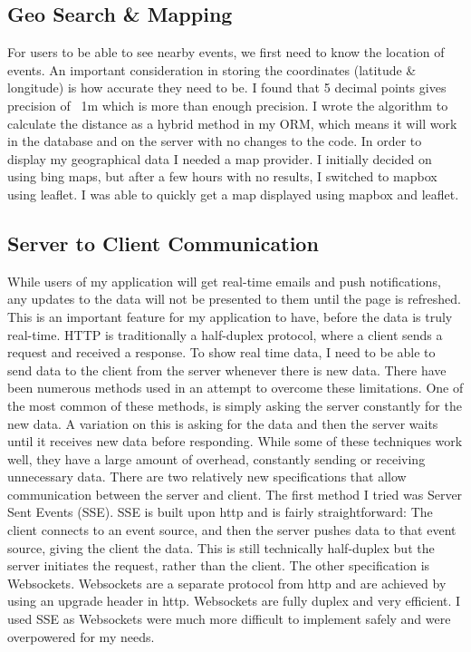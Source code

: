 \documentclass[12pt, draft]{report}
\begin{document}
	\subsection{Geo Search \& Mapping}
	For users to be able to see nearby events, we first need to know the location of events. An important consideration in storing the coordinates (latitude \& longitude) is how accurate they need to be. I found that 5 decimal points gives precision of ~1m which is more than enough precision. I wrote the algorithm to calculate the distance as a hybrid method in my ORM, which means it will work in the database and on the server with no changes to the code. In order to display my geographical data I needed a map provider. I initially decided on using bing maps, but after a few hours with no results, I switched to mapbox using leaflet. I was able to quickly get a map displayed using mapbox and leaflet.

	\subsection{Server to Client Communication}
	While users of my application will get real-time emails and push notifications, any updates to the data will not be presented to them until the page is refreshed. This is an important feature for my application to have, before the data is truly real-time. HTTP is traditionally a half-duplex protocol, where a client sends a request and received a response. To show real time data, I need to be able to send data to the client from the server whenever there is new data. There have been numerous methods used in an attempt to overcome these limitations. One of the most common of these methods, is simply asking the server constantly for the new data. A variation on this is asking for the data and then the server waits until it receives new data before responding. While some of these techniques work well, they have a large amount of overhead, constantly sending or receiving unnecessary data. There are two relatively new specifications that allow communication between the server and client. The first method I tried was Server Sent Events (SSE). SSE is built upon http and is fairly straightforward: The client connects to an event source, and then the server pushes data to that event source, giving the client the data. This is still technically half-duplex but the server initiates the request, rather than the client. The other specification is Websockets. Websockets are a separate protocol from http and are achieved by using an upgrade header in http. Websockets are fully duplex and very efficient. I used SSE as Websockets were much more difficult to implement safely and were overpowered for my needs.
\end{document}
